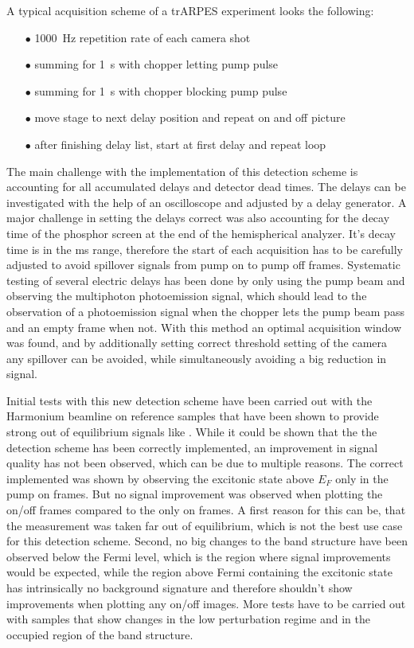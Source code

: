 A typical acquisition scheme of a trARPES experiment looks the following:
\begin{itemize}[topsep=-0.5em]
	\setlength\itemsep{-0.5em}
	\item [$\bullet$] \qty{1000}{\hertz} repetition rate of each camera shot
	\item [$\bullet$] summing for \qty{1}{\second} with chopper letting pump pulse
	\item [$\bullet$] summing for \qty{1}{\second} with chopper blocking pump pulse
	\item [$\bullet$] move stage to next delay position and repeat on and off picture
	\item [$\bullet$] after finishing delay list, start at first delay and repeat loop
\end{itemize}
The main challenge with the implementation of this detection scheme is accounting for all accumulated delays and detector dead times.
The delays can be investigated with the help of an oscilloscope and adjusted by a delay generator.
A major challenge in setting the delays correct was also accounting for the decay time of the phosphor screen at the end of the hemispherical analyzer.
It's decay time is in the \unit{\milli\second} range, therefore the start of each acquisition has to be carefully adjusted to avoid spillover signals from pump on to pump off frames.
Systematic testing of several electric delays has been done by only using the pump beam and observing the multiphoton photoemission signal, which should lead to the observation of a photoemission signal when the chopper lets the pump beam pass and an empty frame when not.
With this method an optimal acquisition window was found, and by additionally setting correct threshold setting of the camera any spillover can be avoided, while simultaneously avoiding a big reduction in signal.

Initial tests with this new detection scheme have been carried out with the Harmonium beamline on reference samples that have been shown to provide strong out of equilibrium signals like  \cite{puppin_excited-state_2022}.
While it could be shown that the the detection scheme has been correctly implemented, an improvement in signal quality has not been observed, which can be due to multiple reasons.
The correct implemented was shown by observing the excitonic state above $E_F$ only in the pump on frames.
But no signal improvement was observed when plotting the on/off frames compared to the only on frames.
A first reason for this can be, that the measurement was taken far out of equilibrium, which is not the best use case for this detection scheme.
Second, no big changes to the band structure have been observed below the Fermi level, which is the region where signal improvements would be expected, while the region above Fermi containing the excitonic state has intrinsically no background signature and therefore shouldn't show improvements when plotting any on/off images.
More tests have to be carried out with samples that show changes in the low perturbation regime and in the occupied region of the band structure.

